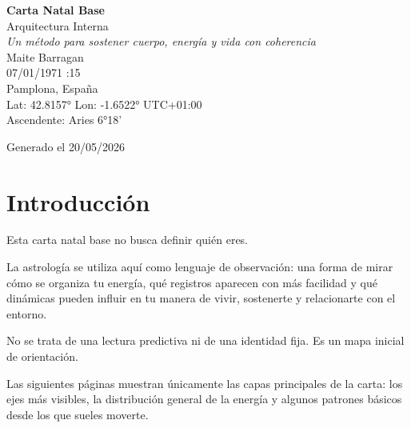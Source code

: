 \documentclass[11pt,a4paper]{article}
\begin{document}

\begin{titlepage}

\centering

\vspace*{1.5cm}

{\Huge\bfseries\color{azulai} Carta Natal Base}\\[0.5cm]

{\large\color{grisai} Arquitectura Interna}\\[0.4cm]

{\small\itshape\color{grisai}
Un método para sostener cuerpo, energía y vida con coherencia
}\\[2cm]

{\huge\color{doradoai} Maite Barragan}\\[1.5cm]

{\Large 07/01/1971 :15}\\[0.3cm]

{\Large Pamplona, España}\\[0.3cm]

{\normalsize
Lat: 42.8157° \quad
Lon: -1.6522° \quad
UTC+01:00
}\\[0.5cm]

{\normalsize
Ascendente: Aries 6°18'
}\\[2.5cm]

\vfill

{\small Generado el 20/05/2026}

\end{titlepage}



\section*{Introducción}

Esta carta natal base no busca definir quién eres.

La astrología se utiliza aquí como lenguaje de observación:
una forma de mirar cómo se organiza tu energía,
qué registros aparecen con más facilidad
y qué dinámicas pueden influir en tu manera de vivir, sostenerte y relacionarte con el entorno.

No se trata de una lectura predictiva ni de una identidad fija.
Es un mapa inicial de orientación.

Las siguientes páginas muestran únicamente las capas principales de la carta:
los ejes más visibles,
la distribución general de la energía
y algunos patrones básicos desde los que sueles moverte.
\end{document}
